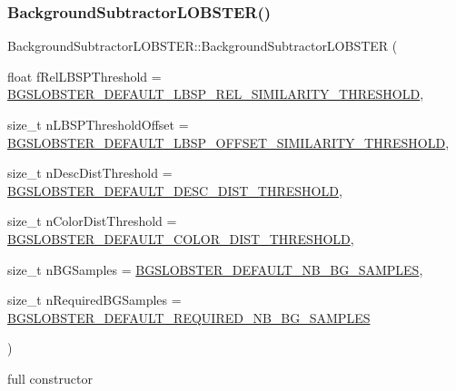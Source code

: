 \subsubsection{\texorpdfstring{Background\+Subtractor\+L\+O\+B\+S\+T\+E\+R()}{BackgroundSubtractorLOBSTER()}}
{\footnotesize\ttfamily Background\+Subtractor\+L\+O\+B\+S\+T\+E\+R\+::\+Background\+Subtractor\+L\+O\+B\+S\+T\+ER (\begin{DoxyParamCaption}\item[{float}]{f\+Rel\+L\+B\+S\+P\+Threshold = {\ttfamily \mbox{\hyperlink{_background_subtractor_l_o_b_s_t_e_r_8h_a3025dcc96b2d2c6416bfa57325d79ba5}{B\+G\+S\+L\+O\+B\+S\+T\+E\+R\+\_\+\+D\+E\+F\+A\+U\+L\+T\+\_\+\+L\+B\+S\+P\+\_\+\+R\+E\+L\+\_\+\+S\+I\+M\+I\+L\+A\+R\+I\+T\+Y\+\_\+\+T\+H\+R\+E\+S\+H\+O\+LD}}},  }\item[{size\+\_\+t}]{n\+L\+B\+S\+P\+Threshold\+Offset = {\ttfamily \mbox{\hyperlink{_background_subtractor_l_o_b_s_t_e_r_8h_a705c59e9c9a6fd8c0c57a5adab5a72c0}{B\+G\+S\+L\+O\+B\+S\+T\+E\+R\+\_\+\+D\+E\+F\+A\+U\+L\+T\+\_\+\+L\+B\+S\+P\+\_\+\+O\+F\+F\+S\+E\+T\+\_\+\+S\+I\+M\+I\+L\+A\+R\+I\+T\+Y\+\_\+\+T\+H\+R\+E\+S\+H\+O\+LD}}},  }\item[{size\+\_\+t}]{n\+Desc\+Dist\+Threshold = {\ttfamily \mbox{\hyperlink{_background_subtractor_l_o_b_s_t_e_r_8h_a11b89942e22902c0bbbbc2f0154804c2}{B\+G\+S\+L\+O\+B\+S\+T\+E\+R\+\_\+\+D\+E\+F\+A\+U\+L\+T\+\_\+\+D\+E\+S\+C\+\_\+\+D\+I\+S\+T\+\_\+\+T\+H\+R\+E\+S\+H\+O\+LD}}},  }\item[{size\+\_\+t}]{n\+Color\+Dist\+Threshold = {\ttfamily \mbox{\hyperlink{_background_subtractor_l_o_b_s_t_e_r_8h_a8442ce9b67919b77ad15847e5d80d983}{B\+G\+S\+L\+O\+B\+S\+T\+E\+R\+\_\+\+D\+E\+F\+A\+U\+L\+T\+\_\+\+C\+O\+L\+O\+R\+\_\+\+D\+I\+S\+T\+\_\+\+T\+H\+R\+E\+S\+H\+O\+LD}}},  }\item[{size\+\_\+t}]{n\+B\+G\+Samples = {\ttfamily \mbox{\hyperlink{_background_subtractor_l_o_b_s_t_e_r_8h_aea7261dd4c4233733b24fd175b6cb2b3}{B\+G\+S\+L\+O\+B\+S\+T\+E\+R\+\_\+\+D\+E\+F\+A\+U\+L\+T\+\_\+\+N\+B\+\_\+\+B\+G\+\_\+\+S\+A\+M\+P\+L\+ES}}},  }\item[{size\+\_\+t}]{n\+Required\+B\+G\+Samples = {\ttfamily \mbox{\hyperlink{_background_subtractor_l_o_b_s_t_e_r_8h_a209f60b8a126e31bb8ec6f8209d95ad0}{B\+G\+S\+L\+O\+B\+S\+T\+E\+R\+\_\+\+D\+E\+F\+A\+U\+L\+T\+\_\+\+R\+E\+Q\+U\+I\+R\+E\+D\+\_\+\+N\+B\+\_\+\+B\+G\+\_\+\+S\+A\+M\+P\+L\+ES}}} }\end{DoxyParamCaption})}



full constructor 



